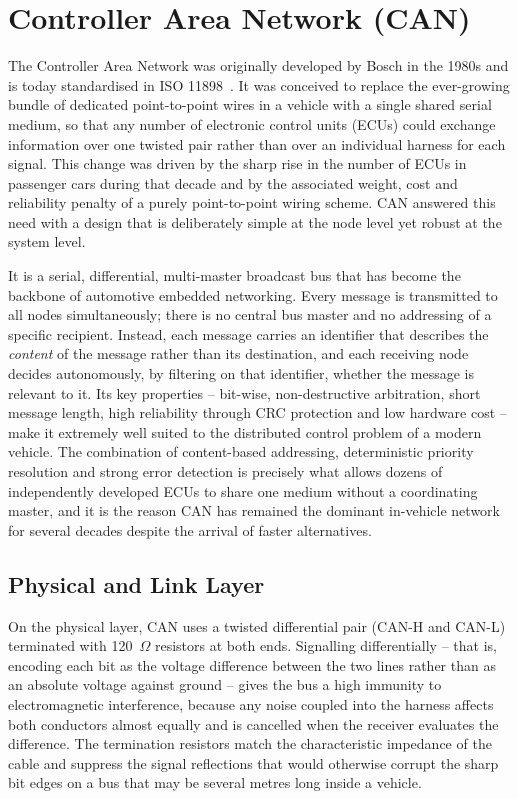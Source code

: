 \documentclass[11pt,a4paper,oneside,parskip=half]{scrreprt}
\begin{document}
\section{Controller Area Network (CAN)}
The Controller Area Network was originally developed by Bosch in the 1980s and is today standardised in ISO 11898~\cite{iso11898}. It was conceived to replace the ever-growing bundle of dedicated point-to-point wires in a vehicle with a single shared serial medium, so that any number of electronic control units (ECUs) could exchange information over one twisted pair rather than over an individual harness for each signal. This change was driven by the sharp rise in the number of ECUs in passenger cars during that decade and by the associated weight, cost and reliability penalty of a purely point-to-point wiring scheme. CAN answered this need with a design that is deliberately simple at the node level yet robust at the system level.

It is a serial, differential, multi-master broadcast bus that has become the backbone of automotive embedded networking. Every message is transmitted to all nodes simultaneously; there is no central bus master and no addressing of a specific recipient. Instead, each message carries an identifier that describes the \emph{content} of the message rather than its destination, and each receiving node decides autonomously, by filtering on that identifier, whether the message is relevant to it. Its key properties -- bit-wise, non-destructive arbitration, short message length, high reliability through CRC protection and low hardware cost -- make it extremely well suited to the distributed control problem of a modern vehicle. The combination of content-based addressing, deterministic priority resolution and strong error detection is precisely what allows dozens of independently developed ECUs to share one medium without a coordinating master, and it is the reason CAN has remained the dominant in-vehicle network for several decades despite the arrival of faster alternatives.

\subsection{Physical and Link Layer}
On the physical layer, CAN uses a twisted differential pair (CAN-H and CAN-L) terminated with 120~$\Omega$ resistors at both ends. Signalling differentially -- that is, encoding each bit as the voltage difference between the two lines rather than as an absolute voltage against ground -- gives the bus a high immunity to electromagnetic interference, because any noise coupled into the harness affects both conductors almost equally and is cancelled when the receiver evaluates the difference. The termination resistors match the characteristic impedance of the cable and suppress the signal reflections that would otherwise corrupt the sharp bit edges on a bus that may be several metres long inside a vehicle.
\end{document}
